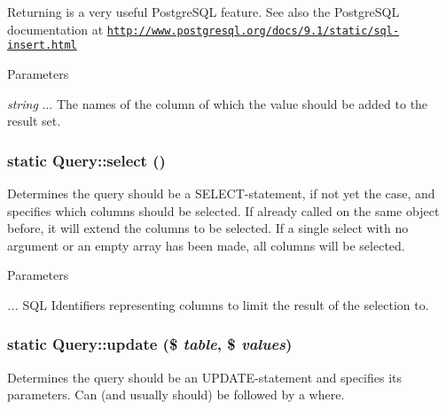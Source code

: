 Returning is a very useful PostgreSQL feature. See also the PostgreSQL documentation at \href{http://www.postgresql.org/docs/9.1/static/sql-insert.html}{\tt http://www.postgresql.org/docs/9.1/static/sql-\/insert.html}


\begin{DoxyParams}{Parameters}
\item[{\em string}]... The names of the column of which the value should be added to the result set. \end{DoxyParams}
\hypertarget{classQuery_af2be941b80c1e376f373ff3d25928a70}{
\subsubsection[{select}]{\setlength{\rightskip}{0pt plus 5cm}static Query::select ()}}
\label{classQuery_af2be941b80c1e376f373ff3d25928a70}
Determines the query should be a SELECT-\/statement, if not yet the case, and specifies which columns should be selected. If already called on the same object before, it will extend the columns to be selected. If a single select with no argument or an empty array has been made, all columns will be selected.


\begin{DoxyParams}{Parameters}
\item[{\em ...}]SQL Identifiers representing columns to limit the result of the selection to. \end{DoxyParams}
\hypertarget{classQuery_abcc72cbfecd4b301f964960dad0611e2}{
\subsubsection[{update}]{\setlength{\rightskip}{0pt plus 5cm}static Query::update (\$ {\em table}, \/  \$ {\em values})}}
\label{classQuery_abcc72cbfecd4b301f964960dad0611e2}
Determines the query should be an UPDATE-\/statement and specifies its parameters. Can (and usually should) be followed by a where.


